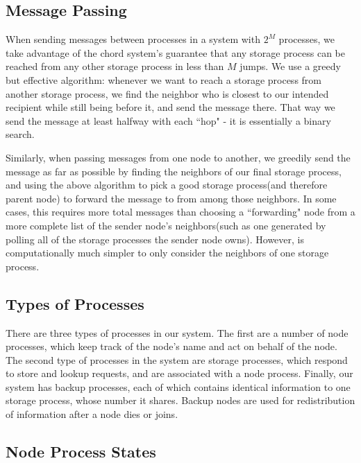 \documentclass[a4paper]{article}
\begin{document}
\subsection{Message Passing}
\label{message passing}
When sending messages between processes in a system with $2^M$ processes, we take advantage of the chord system's guarantee that any storage process can be reached from any other storage process in less than $M$ jumps. We use a greedy but effective algorithm: whenever we want to reach a storage process from another storage process, we find the neighbor who is closest to our intended recipient while still being before it, and send the message there. That way we send the message at least halfway with each ``hop" - it is essentially a binary search.

Similarly, when passing messages from one node to another, we greedily send the message as far as possible by finding the neighbors of our final storage process, and using the above algorithm to pick a good storage process(and therefore parent node) to forward the message to from among those neighbors. In some cases, this requires more total messages than choosing a ``forwarding" node from a more complete list of the sender node's neighbors(such as one generated by polling all of the storage processes the sender node owns). However, is computationally much simpler to only consider the neighbors of one storage process.

\subsection{Types of Processes}
\label{sec:Processes}
    There are three types of processes in our system. The first are a number of node processes, which keep track of the node's name and act on behalf of the node. The second type of processes in the system are storage processes, which respond to store and lookup requests, and are associated with a node process. Finally, our system has backup processes, each of which contains identical information to one storage process, whose number it shares. Backup nodes are used for redistribution of information after a node dies or joins.

\subsection{Node Process States}
\end{document}
